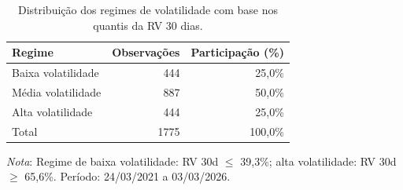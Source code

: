 \begin{table}[H]
\centering
\small
\caption{Distribuição dos regimes de volatilidade com base nos quantis da RV 30 dias.}
\label{tab:retnl-frequencia}
\begin{tabular}{lrr}
\toprule
Regime & Observações & Participação (\%) \\
\midrule
Baixa volatilidade & 444 & 25,0\% \\
Média volatilidade & 887 & 50,0\% \\
Alta volatilidade & 444 & 25,0\% \\
\midrule
Total & 1775 & 100,0\% \\
\bottomrule
\end{tabular}
\par\smallskip
\footnotesize\textit{Nota}: Regime de baixa volatilidade: RV 30d $\leq$ 39,3\%; alta volatilidade: RV 30d $\geq$ 65,6\%. Período: 24/03/2021 a 03/03/2026.
\end{table}